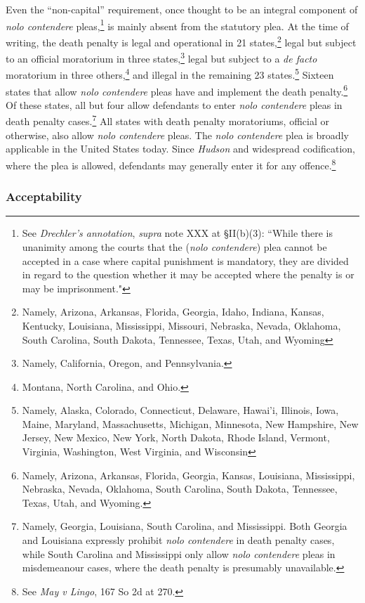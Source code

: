 Even the ``non-capital'' requirement, once thought to be an integral component of \textit{nolo contendere} pleas,\footnote{See \textit{Drechler's annotation}, \textit{supra} note XXX at \S II(b)(3): ``While there is unanimity among the courts that the (\textit{nolo contendere}) plea cannot be accepted in a case where capital punishment is mandatory, they are divided in regard to the question whether it may be accepted where the penalty is or may be imprisonment."} is mainly absent from the statutory plea. At the time of writing, the death penalty is legal and operational in 21 states,\footnote{Namely, Arizona, Arkansas, Florida, Georgia, Idaho, Indiana, Kansas, Kentucky, Louisiana, Mississippi, Missouri, Nebraska, Nevada, Oklahoma, South Carolina, South Dakota, Tennessee, Texas, Utah, and Wyoming} legal but subject to an official moratorium in three states,\footnote{Namely, California, Oregon, and Pennsylvania.} legal but subject to a \textit{de facto} moratorium in three others,\footnote{Montana, North Carolina, and Ohio.} and illegal in the remaining 23 states.\footnote{Namely, Alaska, Colorado, Connecticut, Delaware, Hawai'i, Illinois, Iowa, Maine, Maryland, Massachusetts, Michigan, Minnesota, New Hampshire, New Jersey, New Mexico, New York, North Dakota, Rhode Island, Vermont, Virginia, Washington, West Virginia, and Wisconsin} Sixteen states that allow \textit{nolo contendere} pleas have and implement the death penalty.\footnote{Namely, Arizona, Arkansas, Florida, Georgia, Kansas, Louisiana, Mississippi, Nebraska, Nevada, Oklahoma, South Carolina, South Dakota, Tennessee, Texas, Utah, and Wyoming.}  Of these states, all but four allow defendants to enter \textit{nolo contendere} pleas in death penalty cases.\footnote{Namely, Georgia, Louisiana, South Carolina, and Mississippi. Both Georgia and Louisiana expressly prohibit \textit{nolo contendere} in death penalty cases, while South Carolina and Mississippi only allow \textit{nolo contendere} pleas in misdemeanour cases, where the death penalty is presumably unavailable.} All states with death penalty moratoriums, official or otherwise, also allow \textit{nolo contendere} pleas. The \textit{nolo contendere} plea is broadly applicable in the United States today. Since \textit{Hudson} and widespread codification, where the plea is allowed, defendants may generally enter it for any offence.\footnote{See \textit{May v Lingo}, 167 So 2d at 270.}

\subsubsection{Acceptability}

